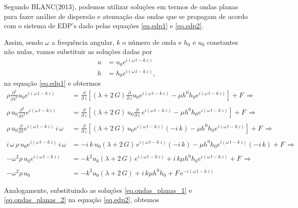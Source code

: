 Segundo BLANC(2013), podemos utilizar solu\c{c}\~oes em termos de ondas planas para fazer an\'alise de dispers\~ao e atenua\c{c}\~ao das ondas que se propagam de acordo com o sistema de EDP's dado pelas equa\c{c}\~oes \ref{eq.edp1} e \ref{eq.edp2}.

Assim, sendo $\omega$ a frequ\^encia angular, $k$ o n\'umero de onda e $h_0$ e $u_0$ constantes n\~ao nulas, vamos substituir as solu\c{c}\~oes dadas por 
\begin{align}\label{eq.ondas_planas_1}
u&=u_0e^{i(\omega\,t-k\,z)}\\\label{eq.ondas_planas_2}
h&=h_0e^{i(\omega\,t-k\,z)},
\end{align}
na equa\c{c}\~ao \ref{eq.edp1} e obtermos
\begin{align}\nonumber
\rho\frac{\partial^2}{\partial\,t^2}u_0e^{i(\omega\,t-k\,z)}&=\frac{\partial}{\partial\,z}\left[(\lambda+2\,G)\frac{\partial}{\partial\,z}u_0e^{i(\omega\,t-k\,z)}-\mu h^0h_0e^{i(\omega\,t-k\,z)}\right]+F\,\Rightarrow\\\nonumber\\\nonumber
\rho\,u_0\frac{\partial^2}{\partial\,t^2}e^{i(\omega\,t-k\,z)}&=\frac{\partial}{\partial\,z}\left[(\lambda+2\,G)\,u_0\frac{\partial}{\partial\,z}\,e^{i(\omega\,t-k\,z)}-\mu h^0h_0e^{i(\omega\,t-k\,z)}\right]+F\,\Rightarrow\\\nonumber\\\nonumber
\rho\,u_0\frac{\partial}{\partial\,t}e^{i(\omega\,t-k\,z)}\,i\,\omega&=\frac{\partial}{\partial\,z}\left[(\lambda+2\,G)\,u_0e^{i(\omega\,t-k\,z)}(-i\,k)-\mu h^0h_0e^{i(\omega\,t-k\,z)}\right]+F\,\Rightarrow\\\nonumber\\\nonumber
i\,\omega\,\rho\,u_0e^{i(\omega\,t-k\,z)}\,i\,\omega&=-i\,k\,u_0(\lambda+2\,G)\,e^{i(\omega\,t-k\,z)}(-i\,k)-\mu h^0h_0e^{i(\omega\,t-k\,z)}(-i\,k)+F\,\Rightarrow\\\nonumber\\\nonumber
-\omega^2\rho\,u_0e^{i(\omega\,t-k\,z)}&=-k^2u_0(\lambda+2\,G)\,e^{i(\omega\,t-k\,z)}+i\,k\mu h^0h_0e^{i(\omega\,t-k\,z)}+F\,\Rightarrow\\\nonumber\\\label{eq.dedu_1}
-\omega^2\rho\,u_0&=-k^2u_0(\lambda+2\,G)+i\,k\mu h^0h_0+F\,e^{-i(\omega\,t-k\,z)}
\end{align}

Analogamente, substituindo as solu\c{c}\~oes \ref{eq.ondas_planas_1} e \ref{eq.ondas_planas_2} na equa\c{c}\~ao \ref{eq.edp2}, obtemos

